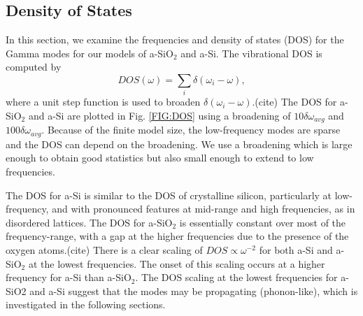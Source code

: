 \documentclass[aps,prb,twocolumn,superscriptaddress,footinbib,amsmath,amssymb,floatfix]{revtex4}
\begin{document}
\subsection{\label{S:DOS}Density of States}

In this section, we examine the frequencies and density of states (DOS)  
for the Gamma modes for our models of a-SiO$_2$ and a-Si. 
The vibrational DOS is computed by 
\begin{equation}\label{EQ:DOS}
DOS(\omega) = \sum_i \delta(\omega_i - \omega),
\end{equation}
where a unit step function is used to broaden 
$\delta(\omega_i - \omega)$.(cite)  
The DOS for a-SiO$_2$ and a-Si are plotted in Fig. \ref{FIG:DOS} 
using a broadening of $10\delta\omega_{avg}$ and $100\delta\omega_{avg}$.  
Because of the finite model size, the low-frequency modes are sparse and 
the DOS can depend on the broadening.
\cite{feldman_numerical_1999} We use a broadening which is large enough 
to obtain good statistics but also small enough to extend 
to low frequencies.   

The DOS for a-Si is similar to the 
DOS of crystalline silicon,
\cite{williams_numerical_1985,donadio_atomistic_2009} particularly 
at low-frequency, and with pronounced features at mid-range and high 
frequencies, as in disordered lattices.
\cite{larkin_predicting_2013,beltukov_ioffe-regel_2013} The DOS for 
a-SiO$_2$ is essentially constant over most of the frequency-range, 
with a gap at the higher frequencies due to the presence of 
the oxygen atoms.(cite)   
There is a clear scaling of $DOS \propto \omega^{-2}$ for both 
a-Si and a-SiO$_2$ at the lowest frequencies. 
The onset of this scaling occurs at a higher frequency 
for a-Si than a-SiO$_2$. The DOS scaling at the lowest 
frequencies for a-SiO2 and a-Si suggest that the modes may be 
propagating (phonon-like),  
which is investigated in the following sections. 

% 
% 
\end{document}
